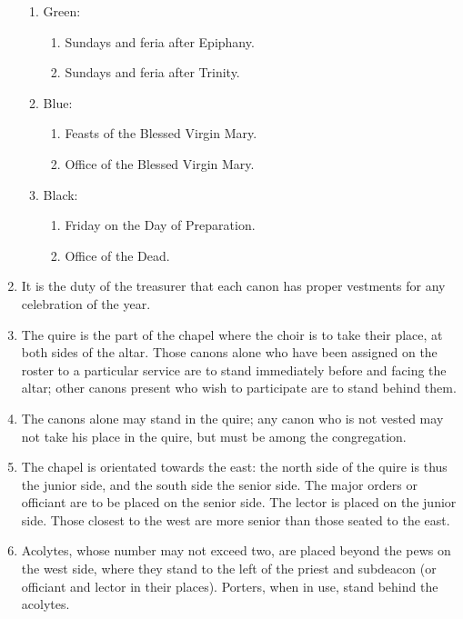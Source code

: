 \begin{enumerate}
\begin{enumerate}
					\item Green: \begin{enumerate}
						\item Sundays and feria after Epiphany.
						\item Sundays and feria after Trinity.
					\end{enumerate}
				
					\item Blue: \begin{enumerate}
						\item Feasts of the Blessed Virgin Mary.
						\item Office of the Blessed Virgin Mary.
					\end{enumerate}
				
					\item Black: \begin{enumerate}
						\item Friday on the Day of Preparation.
						\item Office of the Dead.
					\end{enumerate}
				\end{enumerate}
			
			\item It is the duty of the treasurer that each canon has proper vestments for any celebration of the year.
			
		
			\item The quire is the part of the chapel where the choir is to take their place, at both sides of the altar. Those canons alone who have been assigned on the roster to a particular service are to stand immediately before and facing the altar; other canons present who wish to participate are to stand behind them.
			
			\item The canons alone may stand in the quire; any canon who is not vested may not take his place in the quire, but must be among the congregation.
			
			\item The chapel is orientated towards the east: the north side of the quire is thus the junior side, and the south side the senior side. The major orders or officiant are to be placed on the senior side. The lector is placed on the junior side. Those closest to the west are more senior than those seated to the east.
			
			\item Acolytes, whose number may not exceed two, are placed beyond the pews on the west side, where they stand to the left of the priest and subdeacon (or officiant and lector in their places). Porters, when in use, stand behind the acolytes.
			

\end{enumerate}
